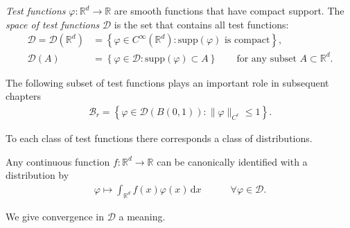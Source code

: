 \begin{definition}
    \emph{Test functions} \(\varphi: \mathbb{R}^d \to \mathbb{R}\) are smooth functions that have compact support. The \emph{space of test functions} \(\mathcal{D}\) is the set that contains all test functions:
    \begin{align*}
        \mathcal{D} = \mathcal{D}(\mathbb{R}^d) &= \left \{ \varphi \in C^\infty(\mathbb{R}^d) : \text{\(\mathrm{supp}(\varphi)\) is compact} \right \}, \\
        \mathcal{D}(A) &= \left \{ \varphi \in \mathcal{D} : \mathrm{supp}(\varphi) \subset A \right \} \qquad \text{for any subset \(A \subset \mathbb{R}^d\).}
    \end{align*}
\end{definition}

The following subset of test functions plays an important role in subsequent chapters
\begin{align*}
    \mathcal{B}_r = \left\{ \varphi \in \mathcal{D}(B(0,1)) : \lVert \varphi \rVert_{C^r} \leq 1 \right\}.
\end{align*}

To each class of test functions there corresponds a class of distributions.

Any continuous function \( f: \mathbb{R}^d \to \mathbb{R} \) can be canonically identified with a distribution by
\begin{align*}
    \varphi \mapsto \int_{\mathbb{R}^d} f(x) \varphi(x) \, \mathrm{d}x \qquad \quad \forall \varphi \in \mathcal{D}.
\end{align*}

We give {convergence in \(\mathcal{D}\)} a meaning.


